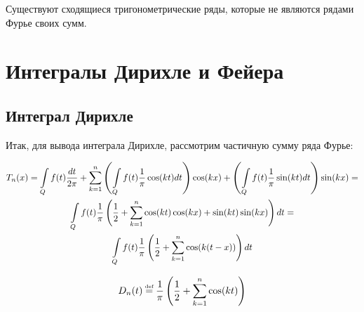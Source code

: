 \begin{nb}
	Существуют сходящиеся тригонометрические ряды, которые не являются рядами Фурье своих сумм.
\end{nb}

\newpage

\section{Интегралы Дирихле и Фейера}

\subsection{Интеграл Дирихле}

Итак, для вывода интеграла Дирихле, рассмотрим частичную сумму ряда Фурье:

\begin{gather*}
	T_n(x) = \int\limits_{Q}f(t)\frac{dt}{2\pi} + 
	\sum\limits_{k = 1}^{n} \left( \int\limits_{Q} f(t)\frac{1}{\pi}\cos(kt)dt\right) \cos(kx) + 
					 \left(	\int\limits_{Q} f(t)\frac{1}{\pi}\sin(kt)dt\right) \sin(kx) = \\
	\int\limits_{Q}f(t)\frac{1}{\pi} 
	\left(\frac{1}{2} + \sum\limits_{k = 1}^{n} \cos(kt)\cos(kx) + \sin(kt)\sin(kx) \right)dt = \\
	\int\limits_{Q}f(t) \frac{1}{\pi} \left( \frac{1}{2} + \sum\limits_{k = 1}^{n} \cos(k(t - x))\right)dt
\end{gather*}

\begin{definition}
	\begin{gather*}
		D_n(t) \defeq \frac{1}{\pi} \left( \frac{1}{2} + \sumlr{k = 1}{n} \cos(kt)\right)
	\end{gather*}
\end{definition}


